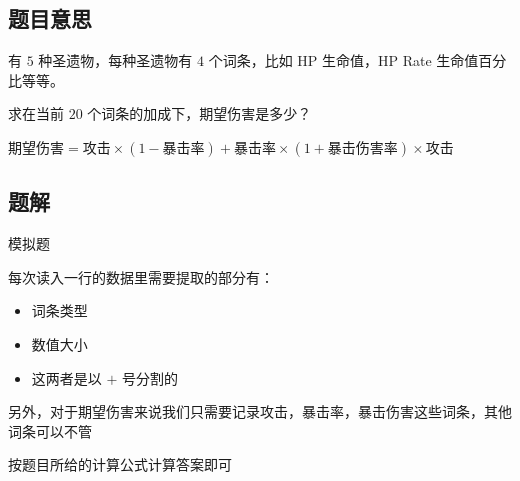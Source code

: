 \subsection{题目意思}
\begin{frame} %
有 $5$ 种圣遗物，每种圣遗物有 $4$ 个词条，比如 HP 生命值，HP Rate 生命值百分比等等。

求在当前 $20$ 个词条的加成下，期望伤害是多少？

$\text{期望伤害} = \text{攻击}\times (1 - \text{暴击率}) + \text{暴击率}\times (1 + \text{暴击伤害率})\times \text{攻击}$
\end{frame}



\subsection{题解}
\begin{frame}
模拟题

每次读入一行的数据里需要提取的部分有：

\begin{itemize}
    \item 词条类型
    \item 数值大小
    \item 这两者是以 $+$ 号分割的
\end{itemize}

另外，对于期望伤害来说我们只需要记录攻击，暴击率，暴击伤害这些词条，其他词条可以不管

按题目所给的计算公式计算答案即可
\end{frame}
